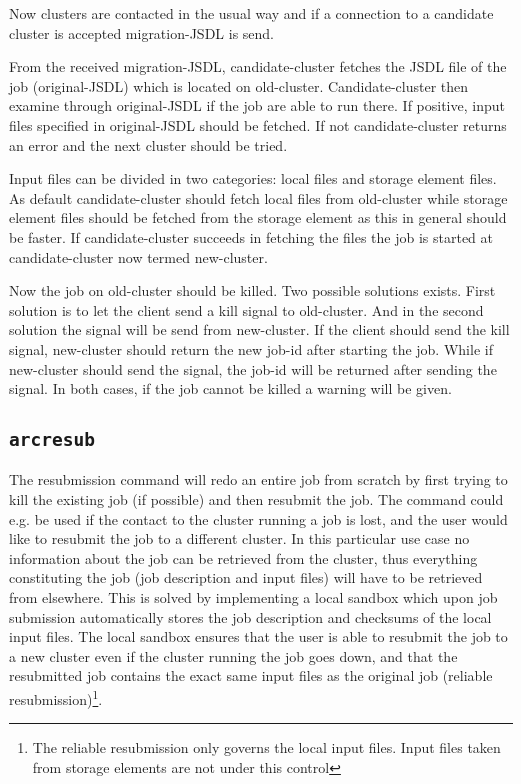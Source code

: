 \documentclass[11pt,oneside,a4paper,english]{article}
\begin{document}
Now clusters are contacted in the usual way and if a connection to a candidate cluster is accepted migration-JSDL is send.

From the received migration-JSDL, candidate-cluster fetches the JSDL file of the job (original-JSDL) which is located on old-cluster. Candidate-cluster then examine through original-JSDL if the job are able to run there. If positive, input files specified in original-JSDL should be fetched. If not candidate-cluster returns an error and the next cluster should be tried.

Input files can be divided in two categories: local files and storage element files. As default candidate-cluster should fetch local files from old-cluster while storage element files should be fetched from the storage element as this in general should be faster. If candidate-cluster succeeds in fetching the files the job is started at candidate-cluster now termed new-cluster.

Now the job on old-cluster should be killed. Two possible solutions exists. First solution is to let the client send a kill signal to old-cluster. And in the second solution the signal will be send from new-cluster. If the client should send the kill signal, new-cluster should return the new job-id after starting the job. While if new-cluster should send the signal, the job-id will be returned after sending the signal. In both cases, if the job cannot be killed a warning will be given.


\subsection*{\texttt{arcresub}}
The resubmission command will redo an entire job from scratch by first trying to kill the existing job (if possible) and then resubmit the job. The command could e.g. be used if the contact to the cluster running a job is lost, and the user would like to resubmit the job to a different cluster. In this particular use case no information about the job can be retrieved from the cluster, thus everything constituting the job (job description and input files) will have to be retrieved from elsewhere. This is solved by implementing a local sandbox which upon job submission automatically stores the job description and checksums of the local input files. The local sandbox ensures that the user is able to resubmit the job to a new cluster even if the cluster running the job goes down, and that the resubmitted job contains the exact same input files as the original job (reliable resubmission)\footnote{The reliable resubmission only governs the local input files. Input files taken from storage elements are not under this control}. 
\end{document}
